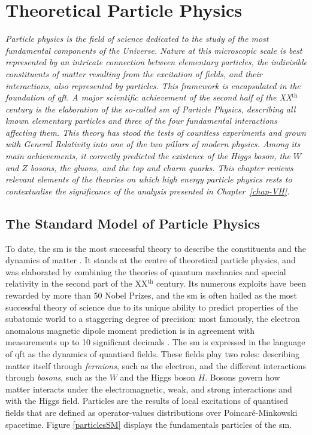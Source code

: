 \chapter{\color{oxfordblue} Theoretical Particle Physics}\label{chap-theory}
\ChapFrame

\textit{Particle physics is the field of science dedicated to the study of the most fundamental components of the Universe. Nature at this microscopic scale is best represented by an intricate connection between elementary particles, the indivisible constituents of matter resulting from the excitation of fields, and their interactions, also represented by particles. This framework is encapsulated in the foundation of \gls{qft}. A major scientific achievement of the second half of the XX$^{\text{th}}$ century is the elaboration of the so-called \gls{sm} of Particle Physics, describing all known elementary particles and three of the four fundamental interactions affecting them. This theory has stood the tests of countless experiments and grown with General Relativity into one of the two pillars of modern physics. Among its main achievements, it correctly predicted the existence of the Higgs boson, the $W$ and $Z$ bosons, the gluons, and the top and charm quarks. This chapter reviews relevant elements of the theories on which high energy particle physics rests to contextualise the significance of the analysis presented in Chapter~\ref{chap-VH}.}

\section{The Standard Model of Particle Physics}\label{Section:SM}
To date, the \gls{sm} is the most successful theory to describe the constituents and the dynamics of matter \cite{SMphysics}. It stands at the centre of theoretical particle physics, and was elaborated by combining the theories of quantum mechanics and special relativity in the second part of the XX$^{\text{th}}$ century. Its numerous exploits have been rewarded by more than 50 Nobel Prizes, and the \gls{sm} is often hailed as the most successful theory of science due to its unique ability to predict properties of the subatomic world to a staggering degree of precision: most famously, the electron anomalous magnetic dipole moment prediction is in agreement with measurements up to 10 significant decimals \cite{PhysRevA.83.052122}. The \gls{sm} is expressed in the language of \gls{qft} as the dynamics of quantised fields. These fields play two roles: describing matter itself through \textit{fermions}, such as the electron, and the different interactions through \textit{bosons}, such as the $W$ and the Higgs boson $H$. Bosons govern how matter interacts under the electromagnetic, weak, and strong interactions and with the Higgs field. Particles are the results of local excitations of quantised fields that are defined as operator-values distributions over Poincaré-Minkowski spacetime. Figure \ref{particlesSM} displays the fundamentals particles of the \gls{sm}. \\

